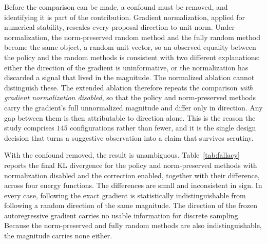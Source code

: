 Before the comparison can be made, a confound must be removed, and identifying it is part of the contribution. Gradient normalization, applied for numerical stability, rescales every proposal direction to unit norm. Under normalization, the norm-preserved random method and the fully random method become the same object, a random unit vector, so an observed equality between the policy and the random methods is consistent with two different explanations: either the direction of the gradient is uninformative, or the normalization has discarded a signal that lived in the magnitude. The normalized ablation cannot distinguish these. The extended ablation therefore repeats the comparison \emph{with gradient normalization disabled}, so that the policy and norm-preserved methods carry the gradient's full unnormalized magnitude and differ only in direction. Any gap between them is then attributable to direction alone. This is the reason the study comprises $145$ configurations rather than fewer, and it is the single design decision that turns a suggestive observation into a claim that survives scrutiny.

With the confound removed, the result is unambiguous. Table~\ref{tab:fallacy} reports the final KL divergence for the policy and norm-preserved methods with normalization disabled and the correction enabled, together with their difference, across four energy functions.
The differences are small and inconsistent in sign. In every case, following the exact gradient is statistically indistinguishable from following a random direction of the same magnitude. The direction of the frozen autoregressive gradient carries no usable information for discrete sampling. Because the norm-preserved and fully random methods are also indistinguishable, the magnitude carries none either.

